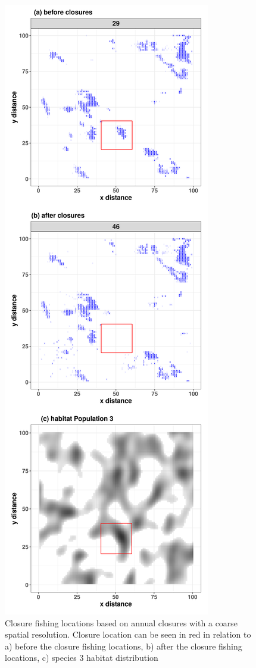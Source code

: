 \documentclass[review]{elsarticle}
\begin{document}
\begin{figure}[!ht]
	\centering
	\includegraphics[width =0.6\linewidth]{./Plots/Closure_fishing_locations_yearly}
	\caption{Closure fishing locations based on annual closures with a
		coarse spatial resolution. Closure location can be seen in red
	in relation to a) before the closure fishing locations, b) after the
	closure fishing locations, c) species 3 habitat distribution}
	\label{fig:17}
\end{figure}	
\end{document}
